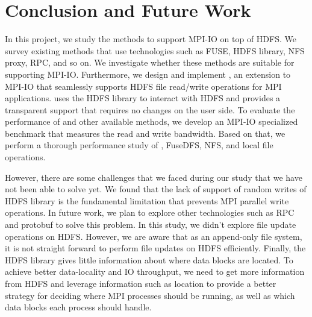 \section{Conclusion and Future Work}
In this project, we study the methods to support MPI-IO on top of HDFS. We
survey existing methods that use technologies such as FUSE, HDFS library, NFS
proxy, RPC, and so on. We investigate whether these methods are
suitable for supporting MPI-IO. Furthermore, we design and implement {\proj}, an
extension to MPI-IO that seamlessly supports HDFS file read/write operations for
MPI applications. {\proj} uses the HDFS library to interact with HDFS and provides
a transparent support that requires no changes on the user side. To evaluate the
performance of {\proj} and other available methods, we develop an MPI-IO
specialized benchmark that measures the read and write bandwidth. Based on that,
we perform a thorough performance study of {\proj}, FuseDFS, NFS, and local file
operations.

However, there are some challenges that we faced during our study that we have not
been able to solve yet. We
found that the lack of support of random writes of HDFS library is the
fundamental limitation that prevents MPI parallel write operations. In future
work, we plan to explore other technologies such as RPC and protobuf to solve
this problem. In this study, we didn't explore file update operations on HDFS.
However, we are aware that as an append-only file system, it is not straight
forward to perform file updates on HDFS efficiently. Finally, the HDFS library gives little
information about where data blocks are located. To achieve better data-locality and
IO throughput, we need to get more information from HDFS and leverage
information such as location to provide a better strategy for deciding where MPI
processes should be running, as well as which data blocks each process should handle.
